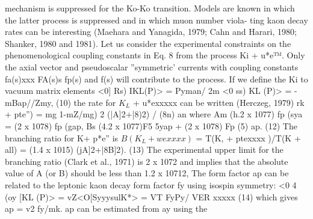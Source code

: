 \documentclass[twoside]{article}
\begin{document}
{{{{{{{{{{mechanism is suppressed for the Ko-Ko transition. Models are known in
which the latter process is suppressed and in which muon number viola-
ting kaon decay rates can be interesting (Maehara and Yanagida, 1979;
Cahn and Harari, 1980; Shanker, 1980 and 1981).
Let us consider the experimental constraints on the phenomenological
coupling constants in Eq. 8 from the process Ki + u*e™. Only the axial
vector and pseudoscalar ''symmetric' currents with coupling constants
fa(s)xxx FA(s)s fp(s) and f(s) will contribute to the process. If we
define the Ki to vacuum matrix elements
<0] Rs) IKL(P)> = Pyman/ 2m
<0 ss) KL (P)> = -mBap//Zmy, (10)
the rate for $K_L$ + u*exxxxx can be written (Herczeg, 1979)
rk + pte”) = mg {1-mZ/mg) 2 (|A]2+|8)2) / (8n) an
where
Am (h.2 x 1077) fp (sya = (2 x 1078) fp (gap,
Bs (4.2 x 1077)F5 5yap + (2 x 1078) Fp (5) ap. (12)
The branching ratio for K+ p*e” is
$B(K_L + wexxxx)$ = T(K, + ptexxxx )/T(K + all)
= (1.4 x 1015) (jA]2+|8B]2). (13)
The experimental upper limit for the branching ratio (Clark et al., 1971)
is 2 x 1072 and implies that the absolute value of A (or B) should be
less than 1.2 x 10712, The form factor ap can be related to the leptonic
kaon decay form factor fy using isospin symmetry:
<0 4} (oy [KL (P)> = vZ<O[SyyysulK*> = VT FyPy/ VER xxxxx (14)
which gives ap = v2 fy/mk. ap can be estimated from ay using the

}}}}}}}}}}
\end{document}
